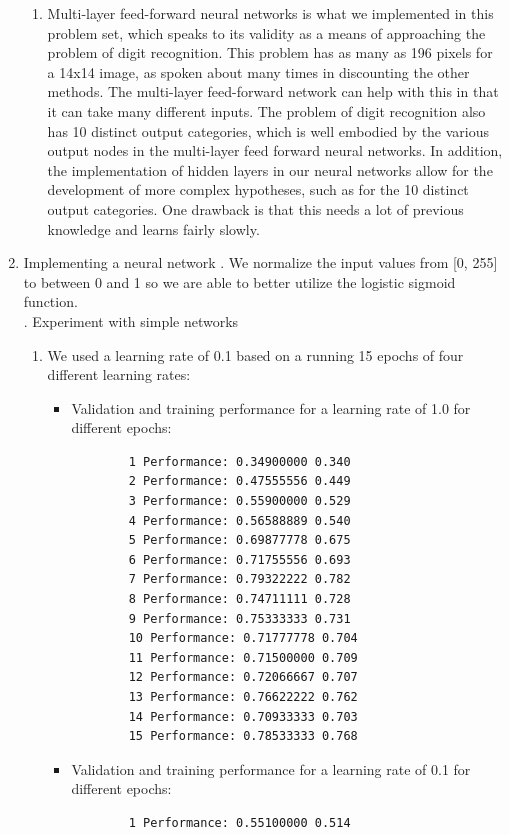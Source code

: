 \documentclass[11pt]{article}
\begin{document}
\begin{enumerate}
\begin{enumerate}
	\item Multi-layer feed-forward neural networks is what we implemented in this problem set, which speaks to its validity as a means of approaching the problem of digit recognition. This problem has as many as 196 pixels for a 14x14 image, as spoken about many times in discounting the other methods. The multi-layer feed-forward network can help with this in that it can take many different inputs. The problem of digit recognition also has 10 distinct output categories, which is well embodied by the various output nodes in the multi-layer feed forward neural networks. In addition, the implementation of hidden layers in our neural networks allow for the development of more complex hypotheses, such as for the 10 distinct output categories. One drawback is that this needs a lot of previous knowledge and learns fairly slowly.
	\end{enumerate}
\item Implementing a neural network
\newline
{}. We normalize the input values from [0, 255] to between 0 and 1 so we are able to better utilize the logistic sigmoid function.\\ 
. Experiment with simple networks
\begin{enumerate}
\item We used a learning rate of 0.1 based on a running 15 epochs of four different learning rates:
	\begin{itemize}
	\item Validation and training performance for a learning rate of 1.0 for different epochs:
		\begin{verbatim}
		1 Performance: 0.34900000 0.340
		2 Performance: 0.47555556 0.449
		3 Performance: 0.55900000 0.529
		4 Performance: 0.56588889 0.540
		5 Performance: 0.69877778 0.675
		6 Performance: 0.71755556 0.693
		7 Performance: 0.79322222 0.782
		8 Performance: 0.74711111 0.728
		9 Performance: 0.75333333 0.731
		10 Performance: 0.71777778 0.704
		11 Performance: 0.71500000 0.709
		12 Performance: 0.72066667 0.707
		13 Performance: 0.76622222 0.762
		14 Performance: 0.70933333 0.703
		15 Performance: 0.78533333 0.768
		\end{verbatim}
	\item Validation and training performance for a learning rate of 0.1 for different epochs:
		\begin{verbatim}
		1 Performance: 0.55100000 0.514

\end{verbatim}
\end{itemize}
\end{enumerate}
\end{enumerate}
\end{document}
